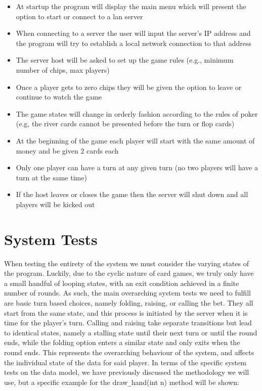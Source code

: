 \documentclass{article}
\begin{document}
\begin{itemize}
\item At startup the program will display the main menu which will present the option to start or connect to a lan server
\item When connecting to a server the user will input the server’s IP address and the program will try to establish a local network connection to that address
\item The server host will be asked to set up the game rules (e.g., minimum number of chips, max players)
\item Once a player gets to zero chips they will be given the option to leave or continue to watch the game
\item The game states will change in orderly fashion according to the rules of poker (e.g, the river cards cannot be presented before the turn or flop cards)
\item At the beginning of the game each player will start with the same amount of money and be given 2 cards each
\item Only one player can have a turn at any given turn (no two players will have a turn at the same time)
\item If the host leaves or closes the game then the server will shut down and all players will be kicked out
\end{itemize}

\section{System Tests}

When testing the entirety of the system we must consider the varying states of the program. Luckily, due to the cyclic nature of card games, we truly only have a small handful of looping states, with an exit condition achieved in a finite number of rounds. As such, the main overarching system tests we need to fulfill are basic turn based choices, namely folding, raising, or calling the bet. They all start from the same state, and this process is initiated by the server when it is time for the player's turn. Calling and raising take separate transitions but lead to identical states, namely a stalling state until their next turn or until the round ends, while the folding option enters a similar state and only exits when the round ends. This represents the overarching behaviour of the system, and affects the individual state of the data for said player. In terms of the specific system tests on the data model, we have previously discussed the methodology we will use, but a specific example for the draw\verb|_|hand(int n) method will be shown:
\end{document}
